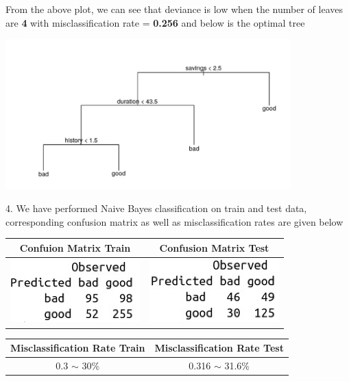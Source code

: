 \documentclass[a4paper,10pt]{article}
\begin{document}
From the above plot, we can see that deviance is low when the number of leaves are \textbf{4} with misclassification rate = \textbf{0.256} and below is the optimal tree \par
\begin{center}
  \includegraphics[width=110mm,scale=0.10]{Optimal_Tree_After_Pruning.png} 
\end{center} \par
\vspace{0.5cm}
4. We have performed Naive Bayes classification on train and test data, corresponding confusion matrix as well as misclassification rates are given below \par
\begin{center}
  \begin{tabular}{|c|c|}
    \hline
    \textbf{Confuion Matrix Train} & \textbf{Confusion Matrix Test} \\
    \hline
    \includegraphics[width=50mm,scale=0.10]{Naive_Bayes_Train_CM.png} & \includegraphics[width=50mm,scale=0.10]{Naive_Bayes_Test_CM.png} \\
    \hline
  \end{tabular} \par
  \begin{tabular}{|c|c|}
    \hline
    \textbf{Misclassification Rate Train} & \textbf{Misclassification Rate Test} \\
    \hline
    0.3 $\sim$ 30\% & 0.316 $\sim$ 31.6\% \\
    \hline
  \end{tabular}
\end{center}
\end{document}
